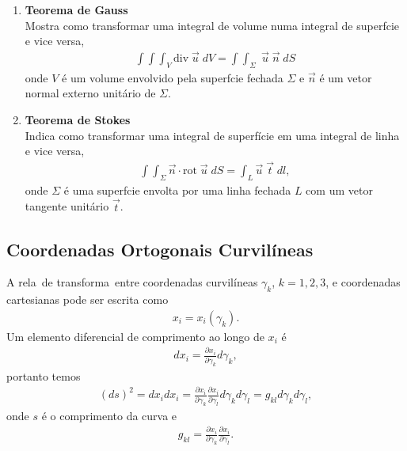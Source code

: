 \begin{enumerate}
\item {\bf Teorema de Gauss}\\
Mostra como transformar uma integral de volume numa integral de
superf\ih cie e vice versa,
\begin{eqnarray}
\int\!\!\!\int\!\!\!\int_{V} \mbox{div}\; \vec{u}\; dV = \int\!\!\!\int_{\Sigma}\; \vec{u}\;  \vec{n}\; dS
\end{eqnarray}
onde $V$ \'e um volume envolvido pela superf\ih cie fechada
$\Sigma$ e $\vec{n}$ \'e um vetor normal externo unit\'ario de
$\Sigma$.

\item {\bf Teorema de Stokes}\\
Indica como transformar uma integral de superf\'icie em uma
integral de linha e vice versa,
\begin{eqnarray}
\int\!\!\!\int_{\Sigma}\vec{n}\cdot\mbox{rot}\; \vec{u}\; dS = \int_{L}\vec{u}\; \vec{t}\; dl,
\end{eqnarray}
onde $\Sigma$ \'e uma superf\ih cie envolta por uma linha fechada
$L$ com um vetor tangente unit\'ario $\vec{t}$.

\end{enumerate}

\subsection {Coordenadas Ortogonais Curvil\'ineas}

A rela\cao\ de transforma\cao\ entre coordenadas curvil\'ineas
$\gamma_{k}$, $k = 1,2,3$, e coordenadas cartesianas pode ser
escrita como
\begin{eqnarray}
x_{i} = x_{i}(\gamma_{k}).
\end{eqnarray}
Um elemento diferencial de comprimento ao longo de $x_{i}$ \'e
\begin{eqnarray}
dx_{i} = \frac{\partial x_{i}}{\partial \gamma_{k}}d\gamma_{k},
\end{eqnarray}
portanto temos
\begin{eqnarray}
(ds)^{2} = dx_{i}dx_{i} = \frac{\partial x_{i}}{\partial
\gamma_{k}}\frac{\partial x_{i}}{\partial
\gamma_{l}}d\gamma_{k}d\gamma_{l} = g_{kl}d\gamma_{k}d\gamma_{l},
\end{eqnarray}
onde $s$ \'e o comprimento da curva e
\begin{eqnarray}
g_{kl} = \frac{\partial x_{i}}{\partial \gamma_{k}}\frac{\partial
x_{i}}{\partial \gamma_{l}}.
\end{eqnarray}

